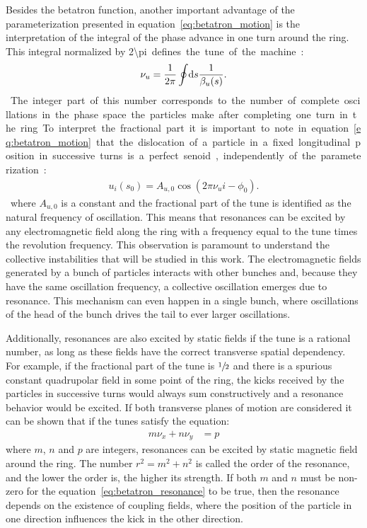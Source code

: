 	Besides the betatron function, another important advantage of the parameterization presented in equation~\eqref{eq:betatron_motion} is the interpretation of the integral of the phase advance in one turn around the ring. This integral normalized by \SI{2\pi} defines the tune of the machine:
	\begin{align}
		\nu_u = \frac{1}{2\pi}\oint\!\text{d}s \frac{1}{\beta_u(s)}.
	\end{align}
	The integer part of this number corresponds to the number of complete oscillations in the phase space the particles make after completing one turn in the ring. To interpret the fractional part it is important to note in equation~\eqref{eq:betatron_motion} that the dislocation of a particle in a fixed longitudinal position in successive turns is a perfect senoid, independently of the parameterization:
	\begin{align}
		u_i(s_0) = A_{u,0}\cos(2\pi\nu_u i -\phi_0).
	\end{align}
	where $A_{u,0}$ is a constant and the fractional part of the tune is identified as the natural frequency of oscillation. This means that resonances can be excited by any electromagnetic field along the ring with a frequency equal to the tune times the revolution frequency. This observation is paramount to understand the collective instabilities that will be studied in this work. The electromagnetic fields generated by a bunch of particles interacts with other bunches and, because they have the same oscillation frequency, a collective oscillation emerges due to resonance. This mechanism can even happen in a single bunch, where oscillations of the head of the bunch drives the tail to ever larger oscillations.

	Additionally, resonances are also excited by static fields if the tune is a rational number, as long as these fields have the correct transverse spatial dependency. For example, if the fractional part of the tune is $\sfrac12$ and there is a spurious constant quadrupolar field in some point of the ring, the kicks received by the particles in successive turns would always sum constructively and a resonance behavior would be excited. If both transverse planes of motion are considered it can be shown that if the tunes satisfy the equation:
	\begin{align}\label{eq:betatron_resonance}
		m\nu_x + n\nu_y &= p
	\end{align}
	where $m$, $n$ and $p$ are integers, resonances can be excited by static magnetic field around the ring. The number $r^2 = m^2 + n^2$ is called the order of the resonance, and the lower the order is, the higher its strength. If both $m$ and $n$ must be non-zero for the equation~\eqref{eq:betatron_resonance} to be true, then the resonance depends on the existence of coupling fields, where the position of the particle in one direction influences the kick in the other direction.

